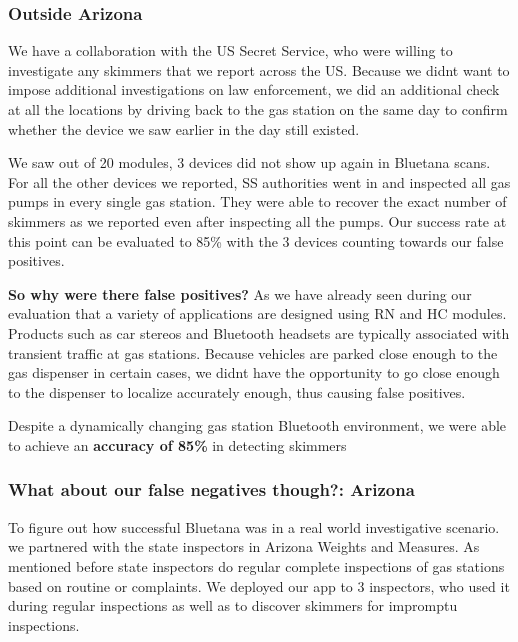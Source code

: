 \subsubsection{Outside Arizona}
We have a collaboration with the US Secret Service, who were willing to investigate any skimmers that we report across the US. Because we didnt want to impose additional investigations on law enforcement, we did an additional check at all the locations by driving back to the gas station on the same day to confirm whether the device we saw earlier in the day still existed. 

We saw out of 20 modules, 3 devices did not show up again in Bluetana scans. For all the other devices we reported, SS authorities went in and inspected all gas pumps in every single gas station. They were able to recover the exact number of skimmers as we reported even after inspecting all the pumps. Our success rate at this point can be evaluated to 85\% with the 3 devices counting towards our false positives.

\textbf{So why were there false positives?} As we have already seen during our evaluation that a variety of applications are designed using RN and HC modules. Products such as car stereos and Bluetooth headsets are typically associated with transient traffic at gas stations. Because vehicles are parked close enough to the gas dispenser in certain cases, we didnt have the opportunity to go close enough to the dispenser to localize accurately enough, thus causing false positives.  

Despite a dynamically changing gas station Bluetooth environment, we were able to achieve an \textbf{accuracy of 85\%} in detecting skimmers

\subsubsection{What about our false negatives though?: Arizona}

To figure out how successful Bluetana was in a real world investigative scenario. we partnered with the state inspectors in Arizona Weights and Measures. As mentioned before state inspectors do regular complete inspections of gas stations based on routine or complaints. We deployed our app to 3 inspectors, who used it during regular inspections as well as to discover skimmers for impromptu inspections.

